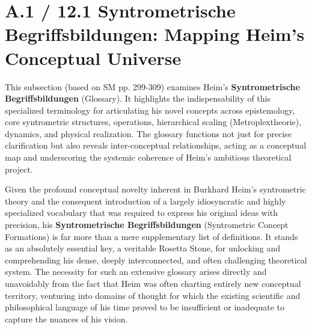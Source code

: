 \documentclass[
    12pt,              %
    a4paper,           %
    headings=normal,   %
    twoside=true,      %
    BCOR=8mm,          %
]{scrbook}
\begin{document}
\section{A.1 / 12.1 Syntrometrische Begriffsbildungen: Mapping Heim's Conceptual Universe}
\label{sec:begriffsbildungen}
This subsection (based on SM pp. 299-309) examines Heim's \textbf{Syntrometrische Begriffsbildungen} (Glossary). It highlights the indispensability of this specialized terminology for articulating his novel concepts across epistemology, core syntrometric structures, operations, hierarchical scaling (Metroplextheorie), dynamics, and physical realization. The glossary functions not just for precise clarification but also reveals inter-conceptual relationships, acting as a conceptual map and underscoring the systemic coherence of Heim's ambitious theoretical project.

Given the profound conceptual novelty inherent in Burkhard Heim’s syntrometric theory and the consequent introduction of a largely idiosyncratic and highly specialized vocabulary that was required to express his original ideas with precision, his \textbf{Syntrometrische Begriffsbildungen} (Syntrometric Concept Formations) is far more than a mere supplementary list of definitions. It stands as an absolutely essential key, a veritable Rosetta Stone, for unlocking and comprehending his dense, deeply interconnected, and often challenging theoretical system. The necessity for such an extensive glossary arises directly and unavoidably from the fact that Heim was often charting entirely new conceptual territory, venturing into domains of thought for which the existing scientific and philosophical language of his time proved to be insufficient or inadequate to capture the nuances of his vision.
\end{document}
